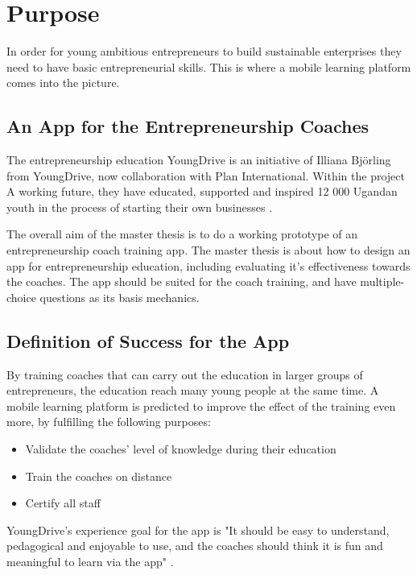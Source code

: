 \section{Purpose}
\label{purpose}

In order for young ambitious entrepreneurs to build sustainable enterprises they need to have basic entrepreneurial skills. This is where a mobile learning platform comes into the picture.

\subsection{An App for the Entrepreneurship Coaches}
The entrepreneurship education YoungDrive is an initiative of Illiana Björling from YoungDrive, now collaboration with Plan International. Within the project A working future, they have educated, supported and inspired 12 000 Ugandan youth in the process of starting their own businesses \citep{nissar}.

The overall aim of the master thesis is to do a working prototype of an entrepreneurship coach training app. The master thesis is about how to design an app for entrepreneurship education, including evaluating it's effectiveness towards the coaches. The app should be suited for the coach training, and have multiple-choice questions as its basis mechanics.

\subsection{Definition of Success for the App}

By training coaches that can carry out the education in larger groups of entrepreneurs, the education reach many young people at the same time. A mobile learning platform is predicted to improve the effect of the training even more, by fulfilling the following purposes:

\begin{itemize}
  \item Validate the coaches' level of knowledge during their education
    \item Train the coaches on distance
    \item Certify all staff
\end{itemize}

YoungDrive's experience goal for the app is "It should be easy to understand, pedagogical and enjoyable to use, and the coaches should think it is fun and meaningful to learn via the app" \citep{youngdrive-masterthesis-idea}.
